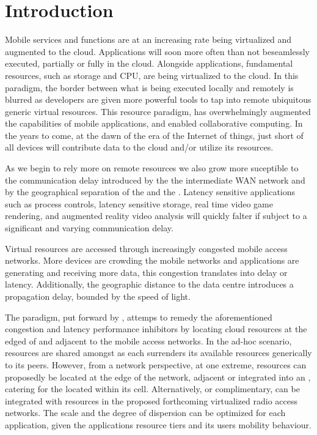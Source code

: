 \section{Introduction}
Mobile services and \ue{} functions are at an increasing rate being virtualized and augmented to the cloud. Applications will soon more often than not beseamlessly executed, partially or fully in the cloud. Alongside applications, fundamental \ue{} resources, such as storage and CPU, are being virtualized to the cloud. In this paradigm, the border between what is being executed locally and remotely is blurred as developers are given more powerful tools to tap into remote ubiquitous generic virtual resources. This resource paradigm, has overwhelmingly augmented the capabilities of mobile applications, and enabled collaborative computing. In the years to come, at the dawn of the era of the Internet of things, just short of all devices will contribute data to the cloud and/or utilize its resources.

As we begin to rely more on remote resources we also grow more suceptible to the communication delay introduced by the the intermediate WAN network and by the geographical separation of the \ue{} and the \dc{}. Latency sensitive applications such as process controls, latency sensitive storage, real time video game rendering, and augmented reality video analysis will quickly falter if subject to a significant and varying communication delay.

Virtual resources are accessed through increasingly congested mobile access networks. More devices are crowding the mobile networks and applications are generating and receiving more data, this congestion translates into delay or latency. Additionally, the geographic distance to the data centre introduces a propagation delay, bounded by the speed of light.

The \xcloud{} paradigm, put forward by \cite{chandra2013decentralized,ericsson_akami}, attemps to remedy the aforementioned congestion and latency performance inhibitors by locating cloud resources at the edged of and adjacent to the mobile access networks. In the ad-hoc scenario, resources are shared amongst \ues{} as each \ue{} surrenders its available resources generically to its peers. However, from a network perspective, at one extreme, \dc{} resources can proposedly be located at the edge of the network, adjacent or integrated into an \rbs{}, catering for the \ues{} located within its cell. Alternatively, or complimentary, \dcs{} can be integrated with resources in the proposed forthcoming virtualized radio access networks. The scale and the degree of dispersion can be optimized for each application, given the applications resource tiers and its users mobility behaviour.

